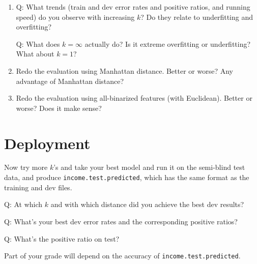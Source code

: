 \documentclass[11pt]{article}
\begin{document}
\begin{enumerate}
\item
  Q: What trends (train and dev error rates and positive ratios,
  and running speed) do you observe with increasing $k$? 
  Do they relate to underfitting and overfitting?

  Q: What does $k=\infty$ actually do? Is it extreme overfitting or underfitting?
  What about $k=1$?

\item Redo the evaluation using Manhattan distance. Better or worse? Any advantage of Manhattan distance?

\item Redo the evaluation using all-binarized features (with Euclidean). Better or worse? Does it make sense?

%
%

\end{enumerate}

\section{Deployment}

Now try more $k$'s and take your best model
and run it on the semi-blind test data, and produce \verb|income.test.predicted|,
which has the same format as the training and dev files.
 
Q: At which $k$ and with which distance did you achieve the best dev results?

Q: What's your best dev error rates and the corresponding positive ratios? 

Q: What's the positive ratio on test?

Part of your grade will depend on the accuracy of \verb|income.test.predicted|.
\end{document}
